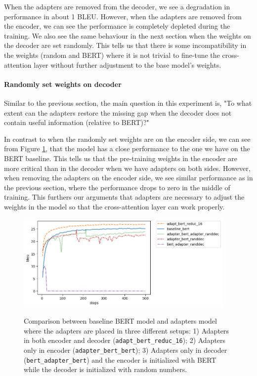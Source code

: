 When the adapters are removed from the decoder, we see a degradation in performance in about 1 BLEU. However, when the adapters are removed from the encoder, we can see the performance is completely depleted during the training. We also see the same behaviour in the next section when the weights on the decoder are set randomly. This tells us that there is some incompatibility in the weights (random and BERT) where it is not trivial to fine-tune the cross-attention layer without further adjustment to the base model's weights.

\paragraph{Randomly set weights on decoder}
Similar to the previous section, the main question in this experiment is, "To what extent can the adapters restore the missing gap when the decoder does not contain useful information (relative to BERT)?"

In contrast to when the randomly set weights are on the encoder side, we can see from Figure \ref{img:adapt_bert_randdec}, that the model has a close performance to the one we have on the BERT baseline. This tells us that the pre-training weights in the encoder are more critical than in the decoder when we have adapters on both sides. However, when removing the adapters on the encoder side, we see similar performance as in the previous section, where the performance drops to zero in the middle of training. This furthers our arguments that adapters are necessary to adjust the weights in the model so that the cross-attention layer can work properly.

\begin{figure}[h]
    {\includegraphics[width=0.95\textwidth]{img/adapter_bert_randdec.png}}
    \centering
    \caption{Comparison between baseline BERT model and adapters model where the adapters are placed in three different setups: 1) Adapters in both encoder and decoder (\texttt{adapt\_bert\_reduc\_16}); 2) Adapters only in encoder (\texttt{adapter\_bert\_bert}); 3) Adapters only in decoder (\texttt{bert\_adapter\_bert}) and the encoder is initialized with BERT while the decoder is initialized with random numbers.}
    \label{img:adapt_bert_randdec}
\end{figure}

